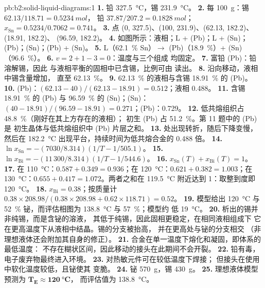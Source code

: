 \begin{solution}{pb:b2:solid-liquid-diagrams:1}
\textbf{1.} 铅 \qty{327.5}{\degreeCelsius}，锡 \qty{231.9}{\degreeCelsius}。
\textbf{2.} 每 \qty{100}{g}：锡 $62.13/118.71 = \qty{0.5234}{mol}$，
铅 $37.87/207.2 = \qty{0.1828}{mol}$；$x_{\mathrm{Sn}} = 0.5234/0.7062 =
0.741$。
\textbf{3.} 点 (0, 327.5)、(100, 231.9)、(62.13, 182.2)、(18.91, 182.2)、
(96.59, 182.2)。
\textbf{4.} 如图所示：液相；L + (Pb)；L + (Sn)；(Pb)；(Sn)；(Pb) + (Sn)。
\textbf{5.} L（62.1~\% Sn）$\longrightarrow$ (Pb)（18.9~\%）+ (Sn)（96.6~\%）。
\textbf{6.} $v = 2 + 1 - 3 = 0$：温度与三个组成
均固定。
\textbf{7.} 富铅 (Pb)：铅溶解锡，因此
与液相平衡的固相中已含锡，比例可由
读出。
\textbf{8.} 沿向移动，液相中锡含量增加，
直至 62.13~\%。
\textbf{9.} 62.13~\% 的液相与含锡 18.91~\% 的 (Pb)。
\textbf{10.} (Pb)：$(62.13 - 40)/(62.13 - 18.91) = 0.512$；液相 0.488。
\textbf{11.} 含锡 18.91~\% 的 (Pb) 与 96.59~\% 的 (Sn)；(Sn)：$(40 - 18.91)/(96.59 -
18.91) = 0.271$；(Pb)：0.729。
\textbf{12.} 低共熔组织占 48.8~\%（刚好在其上方存在的液相）；
初生 (Pb) 占 51.2~\%。第 11 题中的 (Pb) 是
初生晶体与低共熔组织中 (Pb) 片层之和。
\textbf{13.} 处出现转折，随后下降变慢，然后在
\qty{182.2}{\degreeCelsius} 出现平台，持续时间为低共熔合金的 0.488 倍。
\textbf{14.} $\ln x_{\mathrm{Sn}} = -(7030/8.314)(1/T - 1/505.1)$。
\textbf{15.} $\ln x_{\mathrm{Bi}} = -(11\,300/8.314)(1/T - 1/544.6)$。
\textbf{16.} $x_{\mathrm{Sn}}(T) + x_{\mathrm{Bi}}(T) = 1$。
\textbf{17.} 在 \qty{110}{\degreeCelsius}：$0.587 + 0.349 = 0.936$；在
\qty{120}{\degreeCelsius}：$0.621 + 0.382 = 1.003$；在
\qty{130}{\degreeCelsius}：$0.655 + 0.417 = 1.072$。两者之和在
\qty{119.5}{\degreeCelsius} 附近达到 1：取整到度即 \qty{120}{\degreeCelsius}。
\textbf{18.} $x_{\mathrm{Bi}} = 0.38$；按质量计 $0.38 \times 208.98/(0.38 \times
208.98 + 0.62 \times 118.71) = 0.52$。
\textbf{19.} 模型给出 \qty{120}{\degreeCelsius} 与 52~\% 铋，而评估相图为
\qty{138.8}{\degreeCelsius} 与 57~\%；模型约
低 \qty{19}{\degreeCelsius}。
\textbf{20.} 析出的锡并非纯锡，而是含铋的溶液，
其低于纯锡，因此固相更稳定，在相同液相组成下
它在更高温度下从液相中结晶。锡的分支被抬高，
并在更高处与铋的分支相交
（非理想液体还会附加其自身的修正）。
\textbf{21.} 合金在单一温度下熔化和凝固，即体系的最低温度：
不存在糊状区间，因此移动的接头在此期间不会开裂。
\textbf{22.} 铅有毒，电子废弃物最终进入环境。
\textbf{23.} 对热敏元件可在较低温度下焊接；
但接头在使用中软化温度较低，且铋使其
变脆。
\textbf{24.} 铋 \qty{570}{g}，锡 \qty{430}{g}。
\textbf{25.} 理想液体模型预测为 $\boldsymbol{T_E
\approx \qty{120}{\degreeCelsius}}$，
而评估值为 \qty{138.8}{\degreeCelsius}。
\end{solution}
